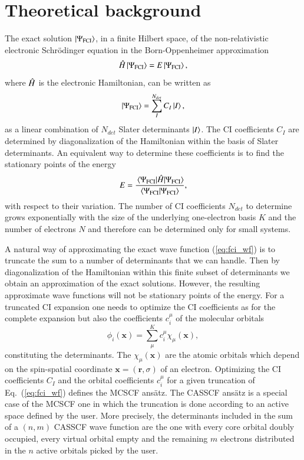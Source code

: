 \documentclass[aps,prb,reprint,showkeys,superscriptaddress]{revtex4-1}
\begin{document}
\section{Theoretical background}
\label{sec:theoretical}

The exact solution $\ket{\Psi_{\text{FCI}}}$, in a finite Hilbert space, of the non-relativistic electronic Schr\"odinger equation in the Born-Oppenheimer approximation
\begin{equation}
  \label{eq:schro_eq}
  \Hat{H} \ket{\Psi_{\text{FCI}}} = E \ket{\Psi_{\text{FCI}}},
\end{equation}
where $\Hat{H}$ is the electronic Hamiltonian, can be written as \cite{Szabo_1996}
\begin{equation}
  \label{eq:fci_wf}
  \ket{\Psi_{\text{FCI}}} = \sum_I^{N_{det}} C_I\ket{I},
\end{equation}
\ie as a linear combination of $N_{det}$ Slater determinants $\ket{I}$.
The CI coefficients $C_I$ are determined by diagonalization of the Hamiltonian within the basis of Slater determinants.
An equivalent way to determine these coefficients is to find the stationary points of the energy
\begin{equation}
  \label{eq:fci_nrj}
  E = \frac{\mel{\Psi_{\text{FCI}}}{\Hat{H}}{\Psi_{\text{FCI}}}}{\braket{\Psi_{\text{FCI}}}{\Psi_{\text{FCI}}}},
\end{equation}
 with respect to their variation.
The number of CI coefficients $N_{det}$ to determine grows exponentially with the size of the underlying one-electron basis $K$ and the number of electrons $N$ and therefore can be determined only for small systems.

A natural way of approximating the exact wave function (\ref{eq:fci_wf}) is to truncate the sum to a number of determinants that we can handle. Then by diagonalization of the Hamiltonian within this finite subset of determinants we obtain an approximation of the exact solutions.
However, the resulting approximate wave functions will not be stationary points of the energy.
For a truncated CI expansion one needs to optimize the CI coefficients as for the complete expansion but also the coefficients $c_i^\mu$ of the molecular orbitals
\begin{equation}
  \label{eq:mo}
  \phi_i(\bm{x}) = \sum^K_\mu c_i^\mu \chi_{\mu}(\bm{x}),
\end{equation}
constituting the determinants. The $\chi_{\mu}(\bm{x})$ are the atomic orbitals which depend on the spin-spatial coordinate $\bm{x} = (\bm{r},\sigma)$ of an electron.
Optimizing the CI coefficients $C_I$ and the orbital coefficients $c_i^\mu$ for a given truncation of Eq.~(\ref{eq:fci_wf}) defines the MCSCF ans\"atz.
The CASSCF ans\"atz is a special case of the MCSCF one in which the truncation is done according to an active space defined by the user.
More precisely, the determinants included in the sum of a $(n,m)$ CASSCF wave function are the one with every core orbital doubly occupied, every virtual orbital empty and the remaining $m$ electrons distributed in the $n$ active orbitals picked by the user.
\end{document}
